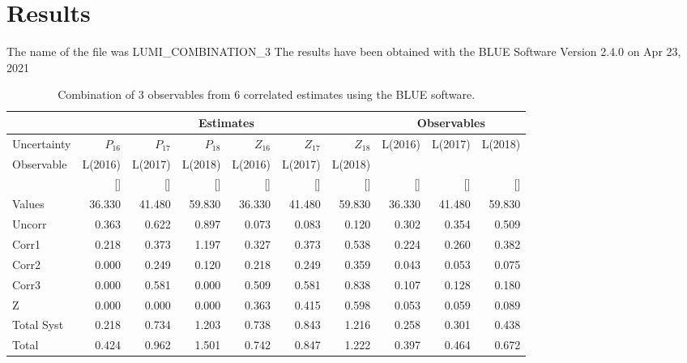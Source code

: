 \documentclass[11pt,a4paper]{article}
\begin{document}
 \section{Results} 
 \label{sec:result} 
 The name of the file was LUMI_COMBINATION_3 
 The results have been obtained with the BLUE Software Version 2.4.0 
 on Apr 23, 2021 
 \par 
%
%
\begin{sidewaystable}[tbp!]
\begin{center}
\begin{tabular}{|l|r|r|r|r|r|r||r|r|r|}
\cline{2-10}
  \multicolumn{1}{c}{} 
& \multicolumn{ 6}{|c||}{Estimates} 
& \multicolumn{ 3}{|c|}{Observables} \\ 
\hline
Uncertainty & $   P_16$ & $   P_17$ & $   P_18$ & $   Z_16$ & $   Z_17$ & $   Z_18$ & L(2016) & L(2017) & L(2018) \\ 
Observable & L(2016) & L(2017) & L(2018) & L(2016) & L(2017) & L(2018) &   &   &   \\ 
 & [] & [] & [] & [] & [] & [] & [] & [] & [] \\ 
\hline
Values  & 36.330 & 41.480 & 59.830 & 36.330 & 41.480 & 59.830 & 36.330 & 41.480 & 59.830 \\ 
 Uncorr & 0.363 & 0.622 & 0.897 & 0.073 & 0.083 & 0.120 & 0.302 & 0.354 & 0.509 \\ 
  Corr1 & 0.218 & 0.373 & 1.197 & 0.327 & 0.373 & 0.538 & 0.224 & 0.260 & 0.382 \\ 
  Corr2 & 0.000 & 0.249 & 0.120 & 0.218 & 0.249 & 0.359 & 0.043 & 0.053 & 0.075 \\ 
  Corr3 & 0.000 & 0.581 & 0.000 & 0.509 & 0.581 & 0.838 & 0.107 & 0.128 & 0.180 \\ 
      Z & 0.000 & 0.000 & 0.000 & 0.363 & 0.415 & 0.598 & 0.053 & 0.059 & 0.089 \\ 
\hline
Total Syst & 0.218 & 0.734 & 1.203 & 0.738 & 0.843 & 1.216 & 0.258 & 0.301 & 0.438 \\ 
Total    & 0.424 & 0.962 & 1.501 & 0.742 & 0.847 & 1.222 & 0.397 & 0.464 & 0.672 \\ 
\hline
\end{tabular}
\end{center}
\caption{Combination of  3 observables from  6 correlated estimates using the BLUE software.}
\label{tab:BlueRes}
\end{sidewaystable}
%
%
\end{document}
